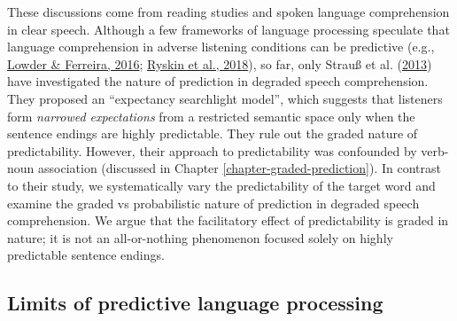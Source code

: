 \documentclass[a4paper, nobind]{templates/ociamthesis}
\begin{document}
These discussions come from reading studies and spoken language comprehension in clear speech.
Although a few frameworks of language processing speculate that language comprehension in adverse listening conditions can be predictive (e.g., \protect\hyperlink{ref-Lowder2016}{Lowder \& Ferreira, 2016}; \protect\hyperlink{ref-Ryskin2018}{Ryskin et al., 2018}),
so far, only Strauß et al. (\protect\hyperlink{ref-Strauss2013}{2013}) have investigated the nature of prediction in degraded speech comprehension.
They proposed an ``expectancy searchlight model'', which suggests that listeners form \emph{narrowed expectations} from a restricted semantic space only when the sentence endings are highly predictable.
They rule out the graded nature of predictability.
However, their approach to predictability was confounded by verb-noun association
(discussed in Chapter \ref{chapter-graded-prediction}).
In contrast to their study, we systematically vary the predictability of the target word
and examine the graded vs probabilistic nature of prediction in degraded speech comprehension.
We argue that the facilitatory effect of predictability is graded in nature;
it is not an all-or-nothing phenomenon focused solely on highly predictable sentence endings.

\hypertarget{limits-of-pp}{%
\subsection{Limits of predictive language processing}\label{limits-of-pp}}
\end{document}
